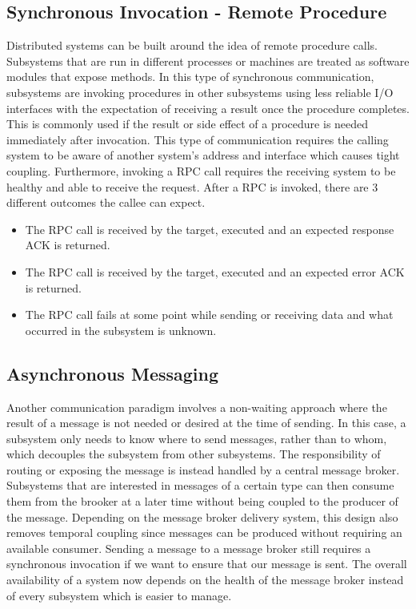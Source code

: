 \documentclass[11pt]{article}
\begin{document}
\subsection{Synchronous Invocation - Remote Procedure}
Distributed systems can be built around the idea of remote procedure calls. Subsystems that are run in different processes or machines are treated as software modules that expose methods. In this type of synchronous communication, subsystems are invoking procedures in other subsystems using less reliable I/O interfaces with the expectation of receiving a result once the procedure completes. This is commonly used if the result or side effect of a procedure is needed immediately after invocation.
\newline
\newline
This type of communication requires the calling system to be aware of another system's address and interface which causes tight coupling. Furthermore, invoking a RPC call requires the receiving system to be healthy and able to receive the request. After a RPC is invoked, there are 3 different outcomes the callee can expect.
\newline
\begin{itemize}
\item The RPC call is received by the target, executed and an expected response ACK is returned.
\item The RPC call is received by the target, executed and an expected error ACK is returned.
\item The RPC call fails at some point while sending or receiving data and what occurred in the subsystem is unknown.
\end{itemize}



\subsection{Asynchronous Messaging}
Another communication paradigm involves a non-waiting approach where the result of a message is not needed or desired at the time of sending. In this case, a subsystem only needs to know where to send messages, rather than to whom, which decouples the subsystem from other subsystems. The responsibility of routing or exposing the message is instead handled by a central message broker.
\newline
\newline
Subsystems that are interested in messages of a certain type can then consume them from the brooker at a later time without being coupled to the producer of the message. Depending on the message broker delivery system, this design also removes temporal coupling since messages can be produced without requiring an available consumer. Sending a message to a message broker still requires a synchronous invocation if we want to ensure that our message is sent. The overall availability of a system now depends on the health of the message broker instead of every subsystem which is easier to manage.
\end{document}
